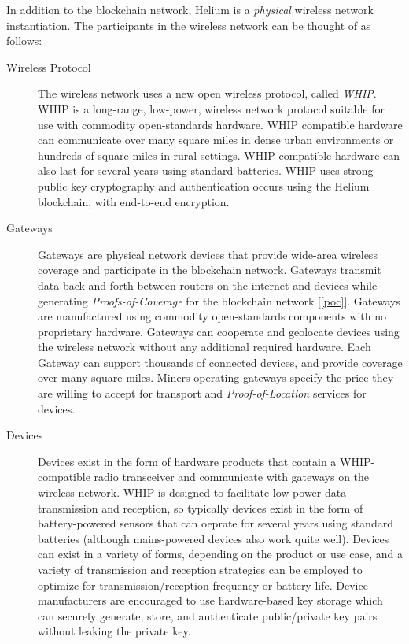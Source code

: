 \documentclass[UTF8, 10pt, nonatbib, nocopyrightspace, reprint]{sigplanconf}
\newcommand{\secref}[1]{[\autoref{#1}]}
\begin{document}
In addition to the blockchain network, Helium is a \emph{physical} wireless network instantiation. The participants in the wireless network can be thought of as follows:

\begin{description}
    \item [Wireless Protocol] The wireless network uses a new open wireless protocol, called \emph{WHIP}. WHIP is a long-range, low-power, wireless network protocol suitable for use with commodity open-standards hardware. WHIP compatible hardware can communicate over many square miles in dense urban environments or hundreds of square miles in rural settings. WHIP compatible hardware can also last for several years using standard batteries. WHIP uses strong public key cryptography and authentication occurs using the Helium blockchain, with end-to-end encryption.

    \item [Gateways] Gateways are physical network devices that provide wide-area wireless coverage and participate in the blockchain network. Gateways transmit data back and forth between routers on the internet and devices while generating \emph{Proofs-of-Coverage} for the blockchain network \secref{poc}. Gateways are manufactured using commodity open-standards components with no proprietary hardware. Gateways can cooperate and geolocate devices using the wireless network without any additional required hardware. Each Gateway can support thousands of connected devices, and provide coverage over many square miles. Miners operating gateways specify the price they are willing to accept for transport and \emph{Proof-of-Location} services for devices.

    \item [Devices] Devices exist in the form of hardware products that contain a WHIP-compatible radio transceiver and communicate with gateways on the wireless network. WHIP is designed to facilitate low power data transmission and reception, so typically devices exist in the form of battery-powered sensors that can oeprate for several years using standard batteries (although mains-powered devices also work quite well). Devices can exist in a variety of forms, depending on the product or use case, and a variety of transmission and reception strategies can be employed to optimize for transmission/reception frequency or battery life. Device manufacturers are encouraged to use hardware-based key storage which can securely generate, store, and authenticate public/private key pairs without leaking the private key.
\end{description}
\end{document}
